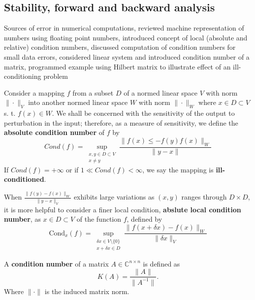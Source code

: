 \documentclass{article}
\theoremstyle{remark}
\begin{document}
\subsection{Stability, forward and backward analysis}%
\label{sub:stability_forward_and_backward_analysis}

\begin{tcolorbox}
  Sources of error in numerical computations, reviewed machine representation of numbers using floating point numbers, introduced concept of local (absolute and relative) condition numbers, discussed computation of condition numbers for small data errors, considered linear system and introduced condition number of a matrix, programmed example using Hilbert matrix to illustrate effect of an ill-conditioning problem	
\end{tcolorbox}

\begin{definition}
  Consider a mapping $f$ from a subset $D$ of a normed linear space  $V$ with norm $\|\cdot \|_{V}$ into another normed linear space $W$ with norm $\|\cdot \|_{W}$ where $x \in D \subset V$ s. t. $f\left( x \right) \in W$. We shall be concerned with the sensitivity of the output to perturbation in the input; therefore, as a measure of sensitivity, we define the \textbf{absolute condition number} of $f$ by \[
    Cond\left( f \right) = \sup_{\substack{x,y \in D \subset V \\ x \neq y}} \frac{\|f\left( x \right) \le- f\left( y \right) f\left( x \right)\|_{W}}{\|y-x\|} 
  \] 
  If $Cond\left( f \right) = +\infty$ or if $ 1 \ll Cond\left( f \right) < \infty$, we say the mapping is \textbf{ill-conditioned}.
\end{definition}
 
\begin{definition}
  When $\frac{\|f\left( y \right) - f\left( x \right)\|_{W}}{\|y-x\|_{V}}$ exhibits large variations as $\left( x,y \right)$ ranges through $D \times D $, it is more helpful to consider a finer local condition, \textbf{abslute local condition number}, as $x \in D \subset V$ of the function $f$, defined by \[
    \text{Cond}_x\left( f \right) = \sup_{\substack{\delta x \in  V \setminus \{0\}  \\ x + \delta x \in D}} { \frac{\|f\left( x + \delta x \right) -  f\left( x \right)\|_{W} }{\|\delta x\|_{V}} } 
  \] 
\end{definition}

\begin{definition}
  A \textbf{condition number} of a matrix $A \in \mathbb{C}^{n\times n }$ is defined as 
\begin{equation}
\label{eq:condition_number}
K\left( A \right) =  \frac{\|A\|}{\|A^{-1}\|}
.\end{equation}
Where $\|\cdot\|$ is the induced matrix norm. 
\end{definition}
\end{document}
